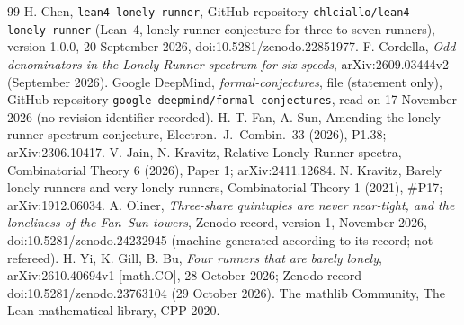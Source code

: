 \documentclass[11pt]{article}
\theoremstyle{remark}
\begin{document}
\begin{thebibliography}{99}
 H. Chen, \texttt{lean4-lonely-runner}, GitHub repository \texttt{chlciallo/lean4-lonely-runner} (Lean~4, lonely runner conjecture for three to seven runners), version 1.0.0, 20 September 2026, doi:10.5281/zenodo.22851977.
 F. Cordella, \emph{Odd denominators in the Lonely Runner spectrum for six speeds}, arXiv:2609.03444v2 (September 2026).
 Google DeepMind, \emph{formal-conjectures}, file  (statement only), GitHub repository \texttt{google-deepmind/formal-conjectures}, read on 17 November 2026 (no revision identifier recorded).
 H. T. Fan, A. Sun, Amending the lonely runner spectrum conjecture, Electron.\ J.\ Combin.\ 33 (2026), P1.38; arXiv:2306.10417.
 V. Jain, N. Kravitz, Relative Lonely Runner spectra, Combinatorial Theory 6 (2026), Paper 1; arXiv:2411.12684.
 N. Kravitz, Barely lonely runners and very lonely runners, Combinatorial Theory 1 (2021), \#P17; arXiv:1912.06034.
 A. Oliner, \emph{Three-share quintuples are never near-tight, and the loneliness of the Fan--Sun towers}, Zenodo record, version 1, November 2026, doi:10.5281/zenodo.24232945 (machine-generated according to its record; not refereed).
 H. Yi, K. Gill, B. Bu, \emph{Four runners that are barely lonely}, arXiv:2610.40694v1 [math.CO], 28 October 2026; Zenodo record doi:10.5281/zenodo.23763104 (29 October 2026).
 The mathlib Community, The Lean mathematical library, CPP 2020.
\end{thebibliography}
\end{document}
